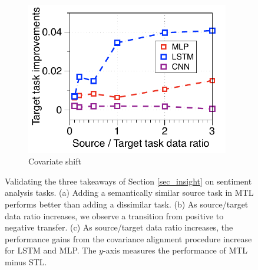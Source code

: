 \begin{figure}[!t]
\begin{subfigure}[b]{0.33\textwidth}
		\includegraphics[width=0.975\textwidth]{figures/ratio_alignment_norm_diff_all.pdf}
		\caption{Covariate shift}
		\label{fig_ab_cov}
	\end{subfigure}
	\caption{Validating the three takeaways of Section \ref{sec_insight} on sentiment analysis tasks. (a) Adding a semantically similar source task in MTL performs better than adding a dissimilar task.
	(b) As source/target data ratio increases, we observe a transition from positive to negative transfer.
	(c) As source/target data ratio increases, the performance gains from the covariance alignment procedure \cite{WZR20} increase for LSTM and MLP.
	The $y$-axis measures the performance of MTL minus STL.}
	\label{fig_ablation}
\end{figure}

